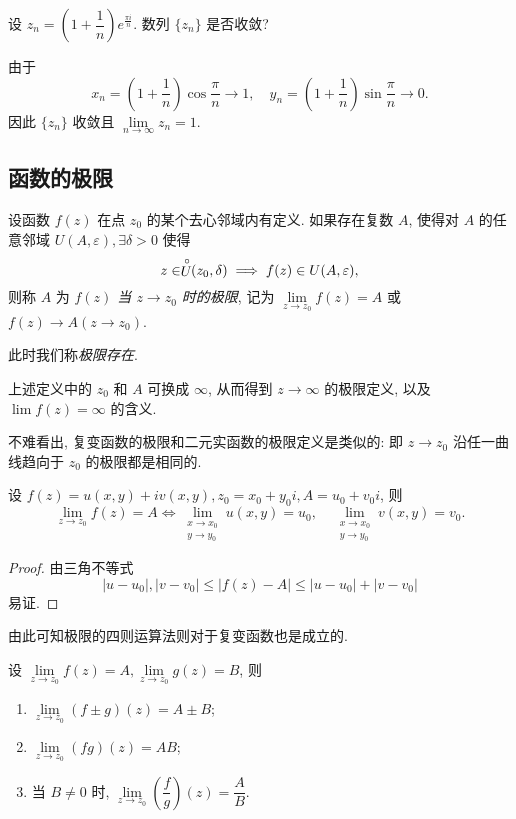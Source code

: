 \begin{example}
  设 $z_n=\left(1+\dfrac1n\right)e^{\frac{\pi i}n}$. 数列 $\{z_n\}$ 是否收敛?
\end{example}

\begin{solution}
  由于
  \[x_n=\left(1+\frac1n\right)\cos\frac\pi n\to 1,\quad
  y_n=\left(1+\frac1n\right)\sin\frac\pi n\to 0.\]
  因此 $\{z_n\}$ 收敛且 $\lim\limits_{n\to\infty}z_n=1$.
\end{solution}

\subsection{函数的极限}

\begin{definition}
  设函数 $f(z)$ 在点 $z_0$ 的某个去心邻域内有定义.
  如果存在复数 $A$, 使得对 $A$ 的任意邻域 $U(A,\varepsilon),\exists\delta>0$ 使得
    \[z\in\stackrel{\circ}{U}\!\!(z_0,\delta)\implies f(z)\in U(A,\varepsilon),\]
  则称 $A$ 为 \emph{$f(z)$ 当 $z\to z_0$ 时的极限}, 记为 \emph{$\lim\limits_{z\to z_0}f(z)=A$} 或 \emph{$f(z)\to A (z\to z_0)$}.
\end{definition}
此时我们称\emph{极限存在}.

上述定义中的 $z_0$ 和 $A$ 可换成 $\infty$, 从而得到 $z\to\infty$ 的极限定义, 以及 $\lim f(z)=\infty$ 的含义.

不难看出, 复变函数的极限和二元实函数的极限定义是类似的:
即 $z\to z_0$ 沿任一曲线趋向于 $z_0$ 的极限都是相同的.

\begin{theorem}
  设 $f(z)=u(x,y)+iv(x,y),z_0=x_0+y_0i,A=u_0+v_0i$, 则
  \[\lim_{z\to z_0}f(z)=A\iff
  \lim_{\substack{x\to x_0\\y\to y_0}}u(x,y)=u_0,\quad
  \lim_{\substack{x\to x_0\\y\to y_0}}v(x,y)=v_0.\]
\end{theorem}

\begin{proof}
  由三角不等式
  \[|u-u_0|,|v-v_0|\le|f(z)-A|\le|u-u_0|+|v-v_0|\]
  易证.
\end{proof}

由此可知极限的四则运算法则对于复变函数也是成立的.

\begin{theorem}
  设 $\lim\limits_{z\to z_0}f(z)=A,\lim\limits_{z\to z_0}g(z)=B$, 则
  \begin{enumerate}
    \item $\lim\limits_{z\to z_0}(f\pm g)(z)=A\pm B$;
    \item $\lim\limits_{z\to z_0}(fg)(z)=AB$;
    \item 当 $B\neq 0$ 时, $\lim\limits_{z\to z_0}\left(\dfrac fg\right)(z)=\dfrac AB$.
  \end{enumerate}
\end{theorem}


